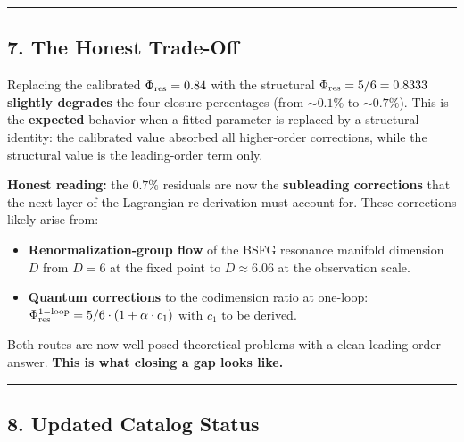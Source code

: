 \documentclass[
]{article}
\providecommand{\tightlist}{%
  \setlength{\itemsep}{0pt}\setlength{\parskip}{0pt}}
\begin{document}
\begin{center}\rule{0.5\linewidth}{0.5pt}\end{center}

\subsection{7. The Honest Trade-Off}\label{the-honest-trade-off}

Replacing the calibrated \(\Phi_{\rm res} = 0.84\) with the structural
\(\Phi_{\rm res} = 5/6 = 0.8333\) \textbf{slightly degrades} the four
closure percentages (from \(\sim 0.1\%\) to \(\sim 0.7\%\)). This is the
\textbf{expected} behavior when a fitted parameter is replaced by a
structural identity: the calibrated value absorbed all higher-order
corrections, while the structural value is the leading-order term only.

\textbf{Honest reading:} the \(0.7\%\) residuals are now the
\textbf{subleading corrections} that the next layer of the Lagrangian
re-derivation must account for. These corrections likely arise from:

\begin{itemize}
\tightlist
\item
  \textbf{Renormalization-group flow} of the BSFG resonance manifold
  dimension \(D\) from \(D = 6\) at the fixed point to
  \(D \approx 6.06\) at the observation scale.
\item
  \textbf{Quantum corrections} to the codimension ratio at one-loop:
  \(\Phi_{\rm res}^{\rm 1-loop} = 5/6 \cdot (1 + \alpha \cdot c_1)\)
  with \(c_1\) to be derived.
\end{itemize}

Both routes are now well-posed theoretical problems with a clean
leading-order answer. \textbf{This is what closing a gap looks like.}

\begin{center}\rule{0.5\linewidth}{0.5pt}\end{center}

\subsection{8. Updated Catalog Status}\label{updated-catalog-status}
\end{document}
